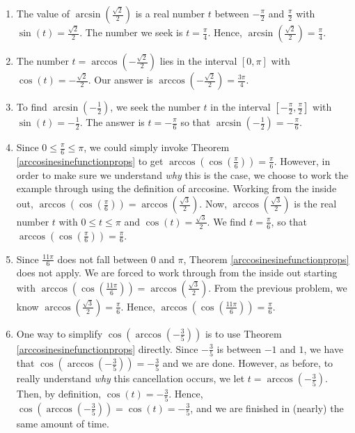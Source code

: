 \documentclass[12pt]{ximera}
\begin{document}
\begin{example}
\begin{enumerate}
\begin{enumerate}
\item  The value of $\arcsin\left(\frac{\sqrt{2}}{2}\right)$ is a real number $t$ between $-\frac{\pi}{2}$ and $\frac{\pi}{2}$ with $\sin(t) = \frac{\sqrt{2}}{2}$.  The number we seek is  $t = \frac{\pi}{4}$. Hence, $\arcsin\left(\frac{\sqrt{2}}{2}\right) = \frac{\pi}{4}$.

\item  The number $t = \arccos\left(-\frac{\sqrt{2}}{2}\right)$ lies in the interval $[0,\pi]$ with $\cos(t) = -\frac{\sqrt{2}}{2}$.  Our answer is $\arccos\left(-\frac{\sqrt{2}}{2}\right) = \frac{3\pi}{4}$.

\item  To find  $\arcsin\left(-\frac{1}{2}\right)$, we seek the number $t$ in the interval $\left[-\frac{\pi}{2}, \frac{\pi}{2}\right]$ with $\sin(t) = -\frac{1}{2}$.  The answer is $t = -\frac{\pi}{6}$ so that $\arcsin\left(-\frac{1}{2}\right) = -\frac{\pi}{6}$.

\item  Since $0 \leq \frac{\pi}{6} \leq \pi$, we could simply invoke Theorem \ref{arccosinesinefunctionprops} to get $\arccos\left( \cos\left(\frac{\pi}{6}\right)\right) = \frac{\pi}{6}$.  However, in order to make sure we understand \textit{why} this is the case, we choose to work the example through using the definition of arccosine.  Working from the inside out,  $\arccos\left( \cos\left(\frac{\pi}{6}\right)\right) = \arccos\left( \frac{\sqrt{3}}{2}\right)$.  Now, $\arccos\left( \frac{\sqrt{3}}{2}\right)$ is the real number $t$ with $0 \leq t \leq \pi$ and $\cos(t) = \frac{\sqrt{3}}{2}$.  We find $t = \frac{\pi}{6}$, so that  $\arccos\left( \cos\left(\frac{\pi}{6}\right)\right) = \frac{\pi}{6}$.

\item Since $\frac{11\pi}{6}$ does not fall between $0$ and $\pi$, Theorem \ref{arccosinesinefunctionprops} does not apply.  We are forced to work through from the inside out starting with  $\arccos\left( \cos\left(\frac{11\pi}{6}\right)\right) = \arccos\left(\frac{\sqrt{3}}{2}\right)$.  From the previous problem, we know $\arccos\left(\frac{\sqrt{3}}{2}\right) = \frac{\pi}{6}$.  Hence,  $\arccos\left( \cos\left(\frac{11\pi}{6}\right)\right) = \frac{\pi}{6}$.

\item  One way to simplify  $\cos\left(\arccos\left(-\frac{3}{5}\right)\right)$ is to use Theorem \ref{arccosinesinefunctionprops} directly.  Since $-\frac{3}{5}$ is between $-1$ and $1$, we have that $\cos\left(\arccos\left(-\frac{3}{5}\right)\right) = -\frac{3}{5}$ and we are done.  However, as before, to really understand \textit{why} this cancellation occurs, we  let $t = \arccos\left(-\frac{3}{5}\right)$.  Then, by definition,  $\cos(t) = -\frac{3}{5}$. Hence, $\cos\left(\arccos\left(-\frac{3}{5}\right)\right) = \cos(t) = -\frac{3}{5}$, and we are finished in (nearly) the same amount of time.


\end{enumerate}
\end{enumerate}
\end{example}
\end{document}
